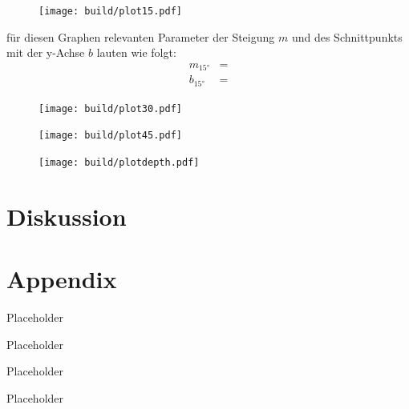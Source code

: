 \begin{figure}[H]
    \centering
    \texttt{[image: build/plot15.pdf]}
    \caption{}
    \label{fig:5}
\end{figure}

    \justifying für diesen Graphen relevanten Parameter der Steigung $m$ und des Schnittpunkts mit der y-Achse $b$ lauten wie folgt:
    \begin{align}
        m_{15°} &= \text{} \label{eq:6}\\
        b_{15°} &= \text{} \label{eq:7}
    \end{align}



\begin{figure}[H]
    \centering
    \texttt{[image: build/plot30.pdf]}
    \caption{}
    \label{fig:6}
\end{figure}



\begin{figure}[H]
    \centering
    \texttt{[image: build/plot45.pdf]}
    \caption{}
    \label{fig:7}
\end{figure}



\begin{figure}[H]
    \centering
    \texttt{[image: build/plotdepth.pdf]}
    \caption{}
    \label{fig:8}
\end{figure}

\section{Diskussion}

\newpage
\printbibliography

\newpage
\section*{Appendix}

\begin{table}[H]
    \centering
    \caption{Placeholder}
    
    \label{tab:1}
\end{table}

\begin{table}[H]
    \centering
    \caption{Placeholder}
    
    \label{tab:2}
\end{table}

\begin{table}[H]
    \centering
    \caption{Placeholder}
    
    \label{tab:3}
\end{table}

\begin{table}[H]
    \centering
    \caption{Placeholder}
    
    \label{tab:4}
\end{table}


